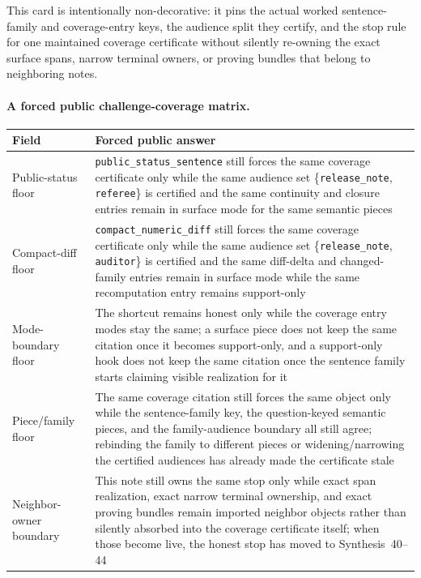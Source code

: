 \documentclass[11pt]{article}
\begin{document}
This card is intentionally non-decorative: it pins the actual worked sentence-family and coverage-entry keys, the audience split they certify, and the stop rule for one maintained coverage certificate without silently re-owning the exact surface spans, narrow terminal owners, or proving bundles that belong to neighboring notes.\cite{series:workedexample}

\paragraph{A forced public challenge-coverage matrix.}
\begin{table}[t]
\centering
\small
\begin{tabularx}{\linewidth}{@{}LY@{}}
\toprule
Field & Forced public answer \\
\midrule
Public-status floor & \nolinkurl{public_status_sentence} still forces the same coverage certificate only while the same audience set \{\nolinkurl{release_note}, \nolinkurl{referee}\} is certified and the same continuity and closure entries remain in \textsf{surface} mode for the same semantic pieces \\
Compact-diff floor & \nolinkurl{compact_numeric_diff} still forces the same coverage certificate only while the same audience set \{\nolinkurl{release_note}, \nolinkurl{auditor}\} is certified and the same diff-delta and changed-family entries remain in \textsf{surface} mode while the same recomputation entry remains \textsf{support-only} \\
Mode-boundary floor & The shortcut remains honest only while the coverage entry modes stay the same; a \textsf{surface} piece does not keep the same citation once it becomes support-only, and a support-only hook does not keep the same citation once the sentence family starts claiming visible realization for it \\
Piece/family floor & The same coverage citation still forces the same object only while the sentence-family key, the question-keyed semantic pieces, and the family-audience boundary all still agree; rebinding the family to different pieces or widening/narrowing the certified audiences has already made the certificate stale \\
Neighbor-owner boundary & This note still owns the same stop only while exact span realization, exact narrow terminal ownership, and exact proving bundles remain imported neighbor objects rather than silently absorbed into the coverage certificate itself; when those become live, the honest stop has moved to Synthesis~40--44 \\

\end{tabularx}
\end{table}
\end{document}
